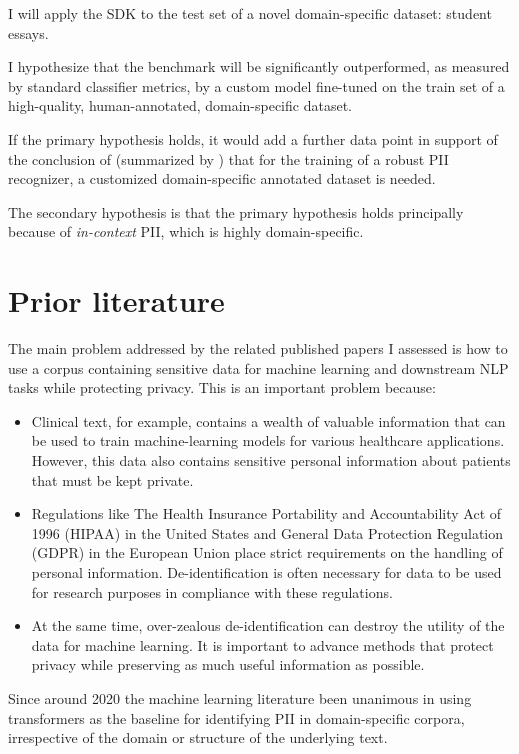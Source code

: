 \documentclass[11pt]{article}
\begin{document}
I will apply the SDK to the test set of a novel domain-specific dataset: student essays.

I hypothesize that the benchmark will be significantly outperformed, as measured by standard classifier metrics, by a custom model fine-tuned on the train set of a high-quality, human-annotated, domain-specific dataset.

If the primary hypothesis holds, it would add a further data point in support of the conclusion of \citealt{Chen2015ASO} (summarized by \citealt{hathurusinghe-etal-2021-privacy}) that for the training of a robust PII recognizer, a customized domain-specific annotated dataset is needed.

The secondary hypothesis is that the primary hypothesis holds principally because of \textit{in-context} PII, which is highly domain-specific.

\section{Prior literature}

The main problem addressed by the related published papers I assessed is how to use a corpus containing sensitive data for machine learning and downstream NLP tasks while protecting privacy. This is an important problem because:

\begin{itemize}
\item Clinical text, for example, contains a wealth of valuable information that can be used to train machine-learning models for various healthcare applications. However, this data also contains sensitive personal information about patients that must be kept private.
\item Regulations like The Health Insurance Portability and Accountability Act of 1996 (HIPAA) in the United States and General Data Protection Regulation (GDPR) in the European Union place strict requirements on the handling of personal information. De-identification is often necessary for data to be used for research purposes in compliance with these regulations.
\item At the same time, over-zealous de-identification can destroy the utility of the data for machine learning. It is important to advance methods that protect privacy while preserving as much useful information as possible.
\end{itemize}

Since around 2020 the machine learning literature been unanimous in using transformers as the baseline for identifying PII in domain-specific corpora, irrespective of the domain or structure of the underlying text.
\end{document}
